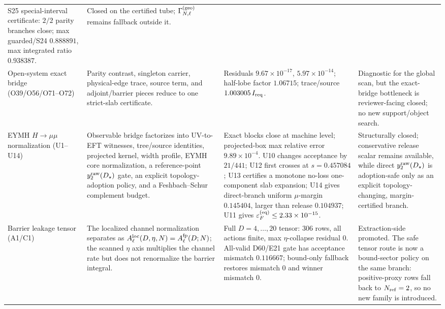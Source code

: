 \documentclass[aps,prd,onecolumn,notitlepage,nofootinbib,superscriptaddress,11pt,floatfix]{revtex4-2}
\begin{document}
\begin{table}[htbp]
\begin{tabular}{@{}l l l l@{}}
\parbox[t]{0.26\textwidth}{S25 special-interval certificate: \(2/2\) parity branches close; max guarded/S24 \(0.888891\), max integrated ratio \(0.938387\).} &
\parbox[t]{0.22\textwidth}{Closed on the certified tube; \(\Gamma_{N,\ell}^{(\rm geo)}\) remains fallback outside it.} \\
\addlinespace
\parbox[t]{0.15\textwidth}{Open-system exact bridge (O39/O56/O71--O72)} &
\parbox[t]{0.27\textwidth}{Parity contrast, singleton carrier, physical-edge trace, source term, and adjoint/barrier pieces reduce to one strict-slab certificate.} &
\parbox[t]{0.26\textwidth}{Residuals \(9.67\times10^{-17}\), \(5.97\times10^{-14}\); half-lobe factor \(1.06715\); trace/source \(1.003005\,I_{\rm req}\).} &
\parbox[t]{0.22\textwidth}{Diagnostic for the global scan, but the exact-bridge bottleneck is reviewer-facing closed; no new support/object search.} \\
\addlinespace
\parbox[t]{0.15\textwidth}{EYMH \(H\to\mu\mu\) normalization (U1--U14)} &
\parbox[t]{0.27\textwidth}{Observable bridge factorizes into UV-to-EFT witnesses, tree/source identities, projected kernel, width profile, EYMH core normalization, a reference-point \(y_2^{\rm raw}(D_\star)\) gate, an explicit topology-adoption policy, and a Feshbach--Schur complement budget.} &
\parbox[t]{0.26\textwidth}{Exact blocks close at machine level; projected-box max relative error \(9.89\times10^{-4}\). U10 changes acceptance by \(21/441\); U12 first crosses at \(s=0.457084\); U13 certifies a monotone no-loss one-component slab expansion; U14 gives direct-branch uniform \(\mu\)-margin \(0.145404\), larger than release \(0.104937\); U11 gives \(\varepsilon_F^{\rm(eq)}\le2.33\times10^{-15}\).} &
\parbox[t]{0.22\textwidth}{Structurally closed; conservative release scalar remains available, while direct \(y_2^{\rm raw}(D_\star)\) is adoption-safe only as an explicit topology-changing, margin-certified branch.} \\
\addlinespace
\parbox[t]{0.15\textwidth}{Barrier leakage tensor (A1/C1)} &
\parbox[t]{0.27\textwidth}{The localized channel normalization separates as \(A_\ell^{\rm loc}(D,\eta,N)=A_\ell^{\rm fp}(D;N)\); the scanned \(\eta\) axis multiplies the channel rate but does not renormalize the barrier integral.} &
\parbox[t]{0.26\textwidth}{Full \(D=4,\dots,20\) tensor: \(306\) rows, all actions finite, max \(\eta\)-collapse residual \(0\). All-valid D60/E21 gate has acceptance mismatch \(0.116667\); bound-only fallback restores mismatch \(0\) and winner mismatch \(0\).} &
\parbox[t]{0.22\textwidth}{Extraction-side promoted. The safe tensor route is now a bound-sector policy on the same branch: positive-proxy rows fall back to \(N_{\rm ref}=2\), so no new family is introduced.} \\

\end{tabular}
\end{table}
\end{document}
